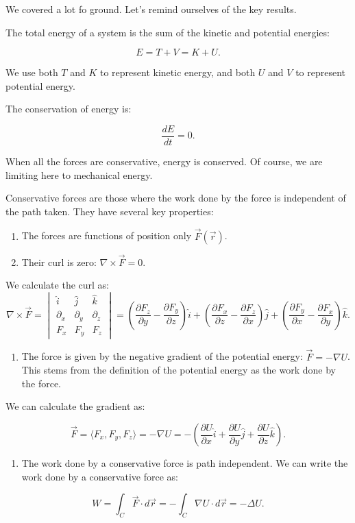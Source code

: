 \documentclass[11pt]{article}
\providecommand{\tightlist}{%
      \setlength{\itemsep}{0pt}\setlength{\parskip}{0pt}}
\begin{document}
We covered a lot fo ground. Let's remind ourselves of the key results.

The total energy of a system is the sum of the kinetic and potential
energies:

\[E = T + V = K +U.\]

We use both \(T\) and \(K\) to represent kinetic energy, and both \(U\)
and \(V\) to represent potential energy.

The conservation of energy is:

\[\dfrac{dE}{dt} = 0.\]

When all the forces are conservative, energy is conserved. Of course, we
are limiting here to mechanical energy.

Conservative forces are those where the work done by the force is
independent of the path taken. They have several key properties:

\begin{enumerate}
\def\labelenumi{\arabic{enumi}.}
\tightlist
\item
  The forces are functions of position only \(\vec{F}(\vec{r})\).
\item
  Their curl is zero: \(\nabla \times \vec{F} = 0\).
\end{enumerate}

We calculate the curl as:
\[\nabla \times \vec{F} = \begin{vmatrix}\hat{i} & \hat{j} & \hat{k} \\ \partial_x & \partial_y & \partial_z \\ F_x & F_y & F_z \end{vmatrix} = \left(\dfrac{\partial F_z}{\partial y} - \dfrac{\partial F_y}{\partial z}\right)\hat{i} + \left(\dfrac{\partial F_x}{\partial z} - \dfrac{\partial F_z}{\partial x}\right)\hat{j} + \left(\dfrac{\partial F_y}{\partial x} - \dfrac{\partial F_x}{\partial y}\right)\hat{k}.\]

\begin{enumerate}
\def\labelenumi{\arabic{enumi}.}
\setcounter{enumi}{2}
\tightlist
\item
  The force is given by the negative gradient of the potential energy:
  \(\vec{F} = -\nabla U\). This stems from the definition of the
  potential energy as the work done by the force.
\end{enumerate}

We can calculate the gradient as:

\[\vec{F} = \langle F_x, F_y, F_z \rangle = -\nabla U = -\left(\dfrac{\partial U}{\partial x}\hat{i} + \dfrac{\partial U}{\partial y}\hat{j} + \dfrac{\partial U}{\partial z}\hat{k}\right).\]

\begin{enumerate}
\def\labelenumi{\arabic{enumi}.}
\setcounter{enumi}{3}
\tightlist
\item
  The work done by a conservative force is path independent. We can
  write the work done by a conservative force as:
\end{enumerate}

\[W = \int_{C} \vec{F}\cdot d\vec{r} = -\int_{C} \nabla U\cdot d\vec{r} = -\Delta U.\]

    


    
    
    
\end{document}
